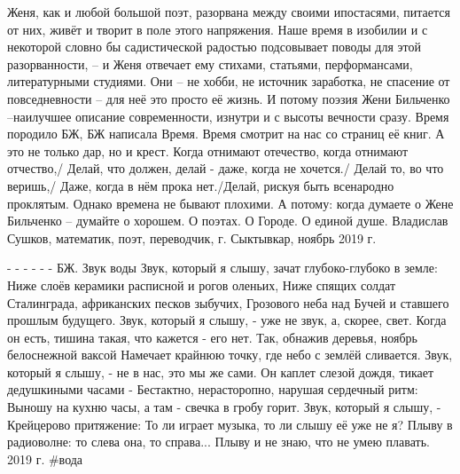 Женя, как и любой большой поэт, разорвана между своими ипостасями, питается от них, живёт и творит в поле этого напряжения. Наше время в изобилии и с некоторой словно бы садистической радостью подсовывает поводы для этой разорванности, – и Женя отвечает ему стихами, статьями, перформансами, литературными студиями. Они – не хобби, не источник заработка, не спасение от повседневности – для неё это просто её жизнь. И потому поэзия Жени Бильченко –наилучшее описание современности, изнутри и с высоты вечности сразу. Время породило БЖ, БЖ написала Время. Время смотрит на нас со страниц её книг. А это не только дар, но и крест. Когда отнимают отечество, когда отнимают отчество,/ Делай, что должен, делай - даже, когда не хочется./ Делай то, во что веришь,/ Даже, когда в нём прока нет./Делай, рискуя быть всенародно проклятым.
Однако времена не бывают плохими. А потому: когда думаете о Жене Бильченко – думайте о хорошем. О поэтах. О Городе. О единой душе.
Владислав Сушков, математик, поэт, переводчик, г. Сыктывкар, ноябрь 2019 г.

- - - - - -
БЖ. Звук воды
Звук, который я слышу, зачат глубоко-глубоко в земле:
Ниже слоёв керамики расписной и рогов оленьих,
Ниже спящих солдат Сталинграда, африканских песков зыбучих,
Грозового неба над Бучей и ставшего прошлым будущего.
Звук, который я слышу, - уже не звук, а, скорее, свет.
Когда он есть, тишина такая, что кажется - его нет.
Так, обнажив деревья, ноябрь белоснежной ваксой
Намечает крайнюю точку, где небо с землёй сливается.
Звук, который я слышу, - не в нас, это мы же сами.
Он каплет слезой дождя, тикает дедушкиными часами -
Бестактно, нерасторопно, нарушая сердечный ритм:
Выношу на кухню часы, а там - свечка в гробу горит.
Звук, который я слышу, - Крейцерово притяжение:
То ли играет музыка, то ли слышу её уже не я?
Плыву в радиоволне: то слева она, то справа...
Плыву и не знаю, что не умею плавать.
2019 г. \#вода
